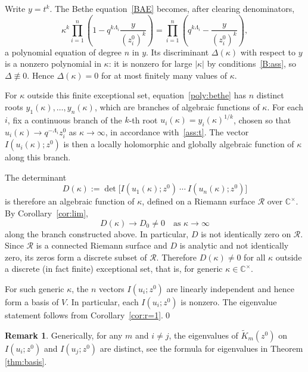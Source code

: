 \documentclass[12pt]{amsart}
\theoremstyle{definition} %
\numberwithin{equation}{section}
\theoremstyle{definition}
\newtheorem*{rem}{Remark}
\let\mc\mathcal
\let\ka\kappa
\let\La\Lambda
\def\C{{\mathbb C}}
\begin{document}
Write $y=t^k$. The Bethe equation~\eqref{BAE} becomes, after clearing
denominators,
\begin{equation}
\label{poly:bethe}
\ka^k
\prod_{i=1}^n\!
\left(1-q^{k\La_i}\frac{y}{(z_i^0)^k}\right)
=
\prod_{i=1}^n\!
\left(q^{k\La_i}-\frac{y}{(z_i^0)^k}\right),
\end{equation}
a polynomial equation of degree $n$ in $y$. Its discriminant
$\Delta(\ka)$ with respect to $y$ is a nonzero polynomial in $\ka$:
it is nonzero for large $|\ka|$ by conditions~\eqref{B:ass}, so
$\Delta\not\equiv0$. Hence $\Delta(\ka)=0$ for at most finitely many
values of $\ka$.

For $\ka$ outside this finite exceptional set, equation~\eqref{poly:bethe}
has $n$ distinct roots $y_1(\ka),\dots,y_n(\ka)$, which are branches
of algebraic functions of $\ka$. For each $i$, fix a continuous branch
of the $k$-th root $u_i(\ka)=y_i(\ka)^{1/k}$, chosen so that
$u_i(\ka)\to q^{-\La_i}z_i^0$ as $\ka\to\infty$, in accordance
with~\eqref{ass:t}. The vector $I(u_i(\ka);z^0)$ is then a locally
holomorphic and globally algebraic function of $\ka$ along this
branch.

The determinant
\[
D(\ka)
:=
\det\bigl[I(u_1(\ka);z^0)\ \cdots\ I(u_n(\ka);z^0)\bigr]
\]
is therefore an algebraic function of $\ka$, defined on a Riemann
surface $\mc R$ over $\C^\times$. By Corollary~\ref{cor:lim},
\[
D(\ka)\longrightarrow D_0\ne0
\quad\text{as }\ka\to\infty
\]
along the branch constructed above. In particular, $D$ is not
identically zero on $\mc R$. Since $\mc R$ is a connected Riemann
surface and $D$ is analytic and not identically zero, its zeros form a
discrete subset of $\mc R$. Therefore $D(\ka)\ne0$ for all $\ka$
outside a discrete (in fact finite) exceptional set, that is, for
generic $\ka\in\C^\times$.

For such generic $\ka$, the $n$ vectors $I(u_i;z^0)$ are linearly
independent and hence form a basis of $V$. In particular, each
$I(u_i;z^0)$ is nonzero. The eigenvalue statement follows from
Corollary~\ref{cor:r=1}.\qed


\begin{rem}

Generically, for any $m$ and $i\ne j$,  the eigenvalues of $\tilde K_m(z^0)$ on  $I(u_i;z^0)$ and $I(u_j;z^0)$ are distinct,
see the formula for eigenvalues in Theorem \ref{thm:basis}.


\end{rem}
\end{document}
